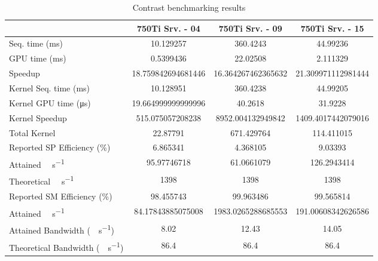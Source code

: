 \begin{table}[H]
	\centering
	\caption{Contrast benchmarking results}
	\label{tab:contrast-results}
	\begin{tabular}{lS[table-format=7.1]S[table-format=7.1]S[table-format=7.1]}
		\toprule
			~ & {\textbf{750Ti Srv. - 04}} & {\textbf{750Ti Srv. - 09}} & {\textbf{750Ti Srv. - 15}} \\
		\midrule
			{Seq. time (\si{\milli\second})} & 10.129257 & 360.4243 & 44.99236 \\
			{GPU time (\si{\milli\second})} & 0.5399436 & 22.02508 & 2.111329 \\
			{Speedup} & 18.759842694681446 &16.364267462365632 & 21.309971112981444 \\
		\midrule
			{Kernel Seq. time (\si{\milli\second})} & 10.128951 & 360.4238 & 44.99205 \\
			{Kernel GPU time (\si{\micro\second})} & 19.664999999999996 & 40.2618 & 31.9228 \\
			{Kernel Speedup} & 515.075057208238 & 8952.004132949842 & 1409.4017442079016 \\
		\midrule
			{Total Kernel \si{\mega\flops}} & 22.87791 & 671.429764 & 114.411015 \\
			{Reported SP Efficiency (\si{\percent})} & 6.865341 & 4.368105 & 9.03393 \\
			{Attained \si{\giga\flops\per\second}} & 95.97746718 & 61.0661079 & 126.2943414 \\
			{Theoretical \si{\giga\flops\per\second}} & 1398 & 1398 & 1398 \\
		\midrule
			{Reported SM Efficiency (\si{\percent})} & 98.455743 & 99.963486 & 99.565814 \\
			{Attained \si{\giga\iops\per\second}} & 84.17843885075008 & 1983.0265288685553 & 191.00608342626586 \\			
		\midrule
			{Attained Bandwidth (\si{\giga\byte\per\second})} & 8.02 & 12.43  & 14.05 \\
			{Theoretical Bandwidth (\si{\giga\byte\per\second})}	& 86.4 & 86.4 & 86.4 \\
		\bottomrule
	\end{tabular}
\end{table}